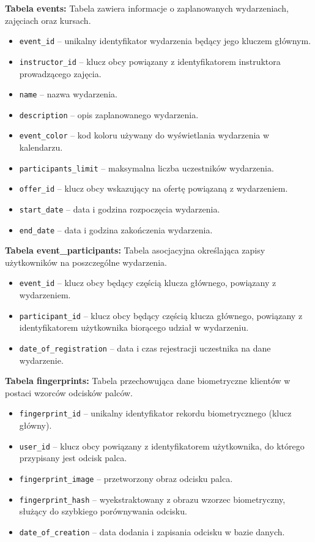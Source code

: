 \noindent\textbf{Tabela events:} Tabela zawiera informacje o zaplanowanych wydarzeniach, zajęciach oraz kursach.
\begin{itemize}[noitemsep, topsep=0pt]
    \item \texttt{event\_id} -- unikalny identyfikator wydarzenia będący jego kluczem głównym.
    \item \texttt{instructor\_id} -- klucz obcy powiązany z identyfikatorem instruktora prowadzącego zajęcia.
    \item \texttt{name} -- nazwa wydarzenia.
    \item \texttt{description} -- opis zaplanowanego wydarzenia.
    \item \texttt{event\_color} -- kod koloru używany do wyświetlania wydarzenia w kalendarzu.
    \item \texttt{participants\_limit} -- maksymalna liczba uczestników wydarzenia.
    \item \texttt{offer\_id} -- klucz obcy wskazujący na ofertę powiązaną z wydarzeniem.
    \item \texttt{start\_date} -- data i godzina rozpoczęcia wydarzenia.
    \item \texttt{end\_date} -- data i godzina zakończenia wydarzenia.
\end{itemize}

\noindent\textbf{Tabela event\_participants:} Tabela asocjacyjna określająca zapisy użytkowników na poszczególne wydarzenia.
\begin{itemize}[noitemsep, topsep=0pt]
    \item \texttt{event\_id} -- klucz obcy będący częścią klucza głównego, powiązany z wydarzeniem.
    \item \texttt{participant\_id} -- klucz obcy będący częścią klucza głównego, powiązany z identyfikatorem użytkownika biorącego udział w wydarzeniu.
    \item \texttt{date\_of\_registration} -- data i czas rejestracji uczestnika na dane wydarzenie.
\end{itemize}

\noindent\textbf{Tabela fingerprints:} Tabela przechowująca dane biometryczne klientów w postaci wzorców odcisków palców.
\begin{itemize}[noitemsep, topsep=0pt]
    \item \texttt{fingerprint\_id} -- unikalny identyfikator rekordu biometrycznego (klucz główny).
    \item \texttt{user\_id} -- klucz obcy powiązany z identyfikatorem użytkownika, do którego przypisany jest odcisk palca.
    \item \texttt{fingerprint\_image} -- przetworzony obraz odcisku palca.
    \item \texttt{fingerprint\_hash} -- wyekstraktowany z obrazu wzorzec biometryczny, służący do szybkiego porównywania odcisku.
    \item \texttt{date\_of\_creation} -- data dodania i zapisania odcisku w bazie danych.
\end{itemize}

